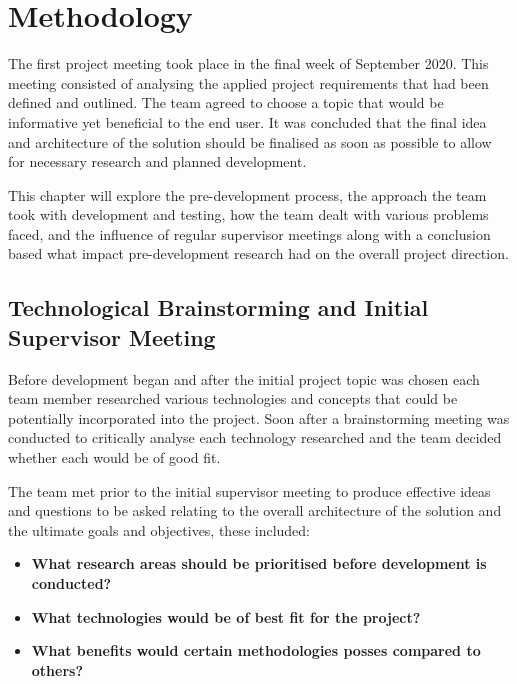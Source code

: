 \chapter{Methodology}
The first project meeting took place in the final week of September 2020. This meeting consisted of analysing the applied project requirements that had been defined and outlined. The team agreed to choose a topic that would be informative yet beneficial to the end user. It was concluded that the final idea and architecture of the solution should be finalised as soon as possible to allow for necessary research and planned development.

\vspace{5mm} %

This chapter will explore the pre-development process, the approach the team took with development and testing, how the team dealt with various problems faced, and the influence of regular supervisor meetings along with a conclusion based what impact pre-development research had on the overall project direction. 

\section{Technological Brainstorming and Initial Supervisor Meeting}
Before development began and after the initial project topic was chosen each team member researched various technologies and concepts that could be potentially incorporated into the project. Soon after a brainstorming meeting was conducted to critically analyse each technology researched and the team decided whether each would be of good fit.

\vspace{5mm} %

The team met prior to the initial supervisor meeting to produce effective ideas and questions to be asked relating to the overall architecture of the solution and the ultimate goals and objectives, these included:

\begin{itemize}

    \item \textbf{What research areas should be prioritised before development is conducted?}

    \item \textbf{What technologies would be of best fit for the project?}
    
    \item \textbf{What benefits would certain methodologies posses compared to others?}
    
\end{itemize}

